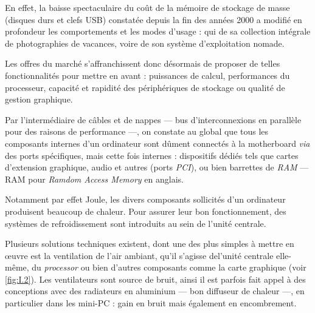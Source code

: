 En effet, la baisse spectaculaire du coût de la mémoire de stockage de masse (disques durs et clefs USB) constatée depuis la fin des années 2000 a modifié en profondeur les comportements et les modes d'usage : qui de sa collection intégrale de photographies de vacances, voire de son système d'exploitation nomade.

Les offres du marché s'affranchissent donc désormais de proposer de telles fonctionnalités pour mettre en avant : puissances de calcul, performances du processeur, capacité et rapidité des périphériques de stockage ou qualité de gestion graphique.

Par l'intermédiaire de câbles et de nappes --- bus d'interconnexions en parallèle pour des raisons de performance ---, on constate au global que tous les composants internes d'un ordinateur sont dûment connectés à la \gls{motherboard} \textit{via} des ports spécifiques, mais cette fois internes : dispositifs dédiés tels que cartes d’extension graphique, audio et autres (ports \emph{PCI}), ou bien barrettes de \emph{\gls{RAM}} --- RAM pour \textit{Ramdom Access Memory} en anglais.

Notamment par effet Joule, les divers composants sollicités d'un ordinateur produisent beaucoup de chaleur. Pour assurer leur bon fonctionnement, des systèmes de refroidissement sont introduits au sein de l'unité centrale.

Plusieurs solutions techniques existent, dont une des plus simples à mettre en œuvre est la ventilation de l'air ambiant, qu'il s'agisse de\linebreak l'unité centrale elle-même, du \emph{\gls{processor}} ou bien d'autres composants comme la carte graphique (voir \cref{fig:I.2}). Les ventilateurs sont source de bruit, ainsi il est parfois fait appel à des conceptions avec des radiateurs en aluminium --- bon diffuseur de chaleur ---, en particulier dans les mini-PC : gain en bruit mais également en encombrement.

